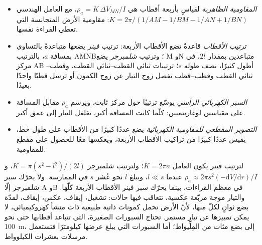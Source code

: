 \begin{definition}\label{def:b3:field-lab-methods-3:resistivity}
\leavevmode
\begin{itemize}
  \item \emph{المقاومية الظاهرية} لقياسٍ بأربعة أقطاب
        هي $\rho_a = K\,\Delta V_{MN}/I$، مع
        العامل الهندسي $K = 2\pi/(1/AM - 1/BM - 1/AN + 1/BN)$: مقاومية
        الأرض المتجانسة التي تعطي
        القراءة نفسها.
  \item \emph{ترتيب الأقطاب} قاعدةٌ
        تضع الأقطاب الأربعة: ترتيب \emph{فينر} يضعها متباعدةً بالتساوي
        بمسافة $a$، بالترتيب AMNB؛ وترتيب
        \emph{شلمبرجر} يضع M وN متباعدين بمقدار $2l$، في
        مركز AB أطول كثيرًا، نصف طوله $s$؛ ترتيبات ثنائي القطب--ثنائي القطب،
        وقطب--ثنائي القطب وقطب--قطب تفصل زوج التيار عن زوج الكمون
        أو ترسل قطبًا واحدًا بعيدًا.
  \item \emph{السبر الكهربائي الرأسي}
        يوسّع ترتيبًا حول مركز ثابت، ويرسم
        $\rho_a$ مقابل المسافة على مقياسين لوغاريتميين: كلّما
        كانت المسافة أكبر، تغلغل التيار إلى عمق أكبر.
  \item \emph{التصوير المقطعي للمقاومية الكهربائية}
        يضع عددًا كبيرًا من الأقطاب على طول خط،
        يقيس عددًا كبيرًا من تراكيب الأقطاب الأربعة، ويعكسها معًا
        للحصول على مقطع للمقاومية.
\end{itemize}
\end{definition}

لترتيب فينر يكون العامل $K = 2\pi a$؛ ولترتيب
شلمبرجر $K = \pi(s^2 - l^2)/(2l)$، و$\rho_a \approx 2\pi s^2(-\mathrm{d}V/
\mathrm{d}r)/I$ عندما $l \ll s$، ويبلغ $l$ نحو عُشر $s$ في
الممارسة. ولا يحرّك سبر شلمبرجر إلّا A وB في معظم القراءات،
بينما يحرّك سبر فينر الأقطاب الأربعة كلّها. والتيار موجة مربّعة عكسية،
تتعاقب فيها حالات: تشغيل، إيقاف، عكس، إيقاف، لمدّة بضع ثوانٍ لكلّ منها، لأنّ
الأرض تحمل كمونات ذاتية طبيعية ذات منشأ كهروكيميائي،
لا يمكن تمييزها عن تيار مستمر.
تحتاج السبورات الصغيرة، التي تتباعد أقطابها حتى نحو \qty{100}{m}، إلى بضع مئات
من المِلِّيواط؛ أما السبورات التي يبلغ عرضها كيلومترًا فتستعمل مرسلات بعشرات
الكيلوواط.

